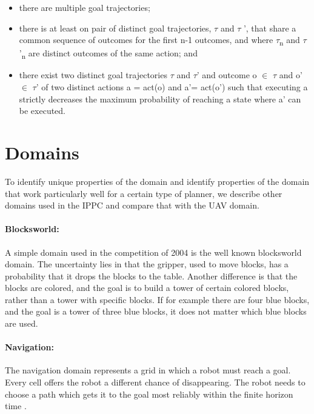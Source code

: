 \documentclass[runningheads,a4paper]{llncs}
\begin{document}
\begin{itemize}
	\item there are multiple goal trajectories;
	\item there is at least on pair of distinct goal trajectories, $\tau$ and $\tau$ ', that share a common sequence of outcomes for the first n-1 outcomes, and where $\tau$\textsubscript{n} and $\tau$'\textsubscript{n} are distinct outcomes of the same action; and
	\item there exist two distinct goal trajectories $\tau$ and $\tau$' and outcome o $\in$ $\tau$ and o' $\in$ $\tau$' of two distinct actions a = act(o) and a'= act(o') such that executing a strictly decreases the maximum probability of reaching a state where a' can be executed.
\end{itemize}



\section{Domains}
\label{sec:domains}

To identify unique properties of the domain and identify properties of the
domain that work particularly well for a certain type of planner, we describe
other domains used in the IPPC and compare that with the UAV domain.

\paragraph{Blocksworld:}
A simple domain used in the competition of 2004 is the well known blocksworld
domain. The uncertainty lies in that the gripper, used to move blocks, has a
probability that it drops the blocks to the table. Another difference is that
the blocks are colored, and the goal is to build a tower of certain colored
blocks, rather than a tower with specific blocks. If for example there are
four blue blocks, and the goal is a tower of three blue blocks, it does not
matter which blue blocks are used.

\paragraph{Navigation:}
The navigation domain represents a grid in which a robot must reach a goal.
Every cell offers the robot a different chance of disappearing. The robot needs
to choose a path which gets it to the goal most reliably within the finite
horizon time \cite{sanner2011navigation}.
\end{document}
